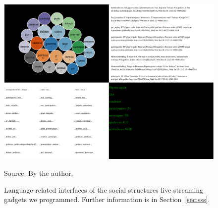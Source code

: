 \begin{apendicesenv}
\begin{figure}[H]
  \centering
    \includegraphics[width=.85\textwidth]{figs/telao2.png}
  \caption{Language-related interfaces of the social structures live streaming gadgets we programmed.
	Further information is in Section~\ref{sec:sss}.}\label{fig:telao2}
\begin{flushleft}\footnotesize
Source: By the author.\
\end{flushleft}
\end{figure}


\end{apendicesenv}
